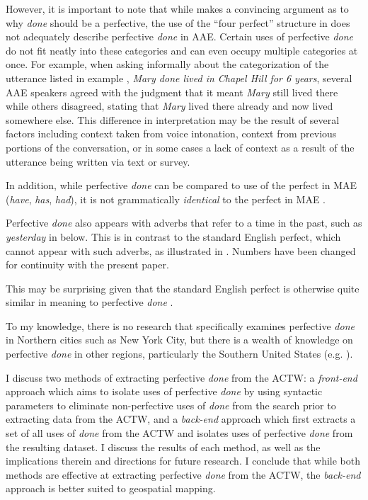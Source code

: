 \documentclass[output=paper,draftmode,colorlinks,citecolor=brown]{langscibook}
\begin{document}
However, it is important to note that while \citet{Terry2010} makes a convincing argument as to why \textit{done} should be a perfective, the use of the “four perfect” structure in \citet{Comrie1976} does not adequately describe perfective \textit{done} in AAE. Certain uses of perfective \textit{done} do not fit neatly into these categories and can even occupy multiple categories at once. For example, when asking informally about the categorization of the utterance listed in example , \textit{Mary done lived in Chapel Hill for 6 years}, several AAE speakers agreed with the judgment that it meant \textit{Mary} still lived there while others disagreed, stating that \textit{Mary} lived there already and now lived somewhere else.  This difference in interpretation may be the result of several factors including context taken from voice intonation, context from previous portions of the conversation, or in some cases a lack of context as a result of the utterance being written via text or survey.

In addition, while perfective \textit{done} can be compared to use of the perfect in MAE (\textit{have}, \textit{has}, \textit{had}), it is not grammatically \textit{identical} to the perfect in MAE \citep{Martin2018}.

Perfective \textit{done} also appears with adverbs that refer to a time in the past, such as \textit{yesterday} in  below. This is in contrast to the standard English perfect, which cannot appear with such adverbs, as illustrated in . Numbers have been changed for continuity with the present paper.

\ea%
\z
\z
This may be surprising given that the standard English perfect is otherwise quite similar in meaning to perfective \textit{done} \citep{Martin2018}.

To my knowledge, there is no research that specifically examines perfective \textit{done} in Northern cities such as New York City, but there is a wealth of knowledge on perfective \textit{done} in other regions, particularly the Southern United States (e.g. \cite{Terry2010, GreenRoeper2007}).

I discuss two methods of extracting perfective \textit{done} from the ACTW: a \textit{front-end} approach which aims to isolate uses of perfective \textit{done} by using syntactic parameters to eliminate non-perfective uses of \textit{done} from the search prior to extracting data from the ACTW, and a \textit{back-end} approach which first extracts a set of all uses of \textit{done} from the ACTW and isolates uses of perfective \textit{done} from the resulting dataset. I discuss the results of each method, as well as the implications therein and directions for future research. I conclude that while both methods are effective at extracting perfective \textit{done} from the ACTW, the \textit{back-end} approach is better suited to geospatial mapping.
\end{document}
